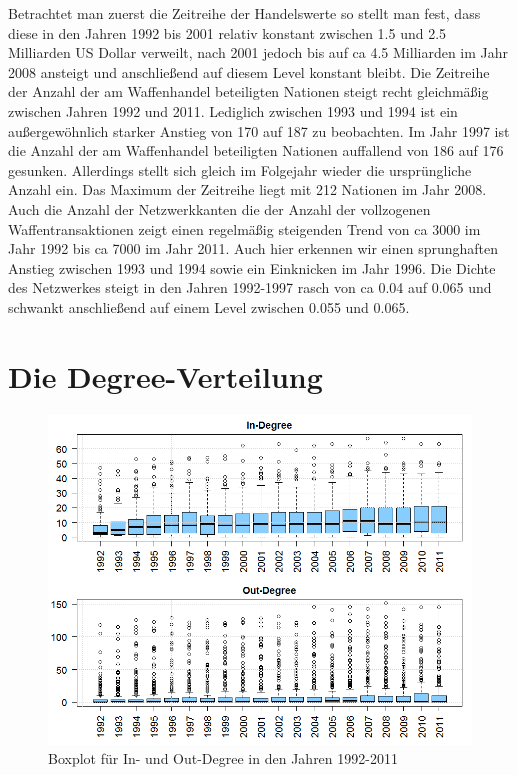 \documentclass[a4paper,ngerman,oneside,titlepage,bibliography=totoc,11pt]{scrreprt}
\begin{document}
Betrachtet man zuerst die Zeitreihe der Handelswerte so stellt man fest, dass diese in den Jahren 1992 bis 2001 relativ konstant zwischen 1.5 und 2.5 Milliarden US Dollar verweilt, nach 2001 jedoch bis auf ca 4.5 Milliarden im Jahr 2008 ansteigt und anschließend auf diesem Level konstant bleibt.
Die Zeitreihe der Anzahl der am Waffenhandel beteiligten Nationen steigt recht gleichmäßig zwischen Jahren 1992 und 2011. Lediglich zwischen 1993 und 1994 ist ein außergewöhnlich starker Anstieg von 170 auf 187 zu beobachten. Im Jahr 1997 ist die Anzahl der am Waffenhandel beteiligten Nationen auffallend von 186 auf 176 gesunken. Allerdings stellt sich gleich im Folgejahr wieder die ursprüngliche Anzahl ein. Das Maximum der Zeitreihe liegt mit 212 Nationen im Jahr 2008.
Auch die Anzahl der Netzwerkkanten die der Anzahl der vollzogenen Waffentransaktionen zeigt einen regelmäßig steigenden Trend von ca 3000 im Jahr 1992 bis ca 7000 im Jahr 2011. Auch hier erkennen wir einen sprunghaften Anstieg zwischen 1993 und 1994 sowie ein Einknicken im Jahr 1996.
Die Dichte des Netzwerkes steigt in den Jahren 1992-1997 rasch von ca 0.04 auf 0.065 und schwankt  anschließend auf einem Level zwischen 0.055 und 0.065.

\section{Die Degree-Verteilung}

\label{sec:degree}
\begin{figure}[ht]
	\centering
		\includegraphics[width=1.00\textwidth]{Grafiken/ts_degree.png}
	\caption{Boxplot für In- und Out-Degree in den Jahren 1992-2011}
	\label{fig:ts_degree}
\end{figure}
\end{document}
